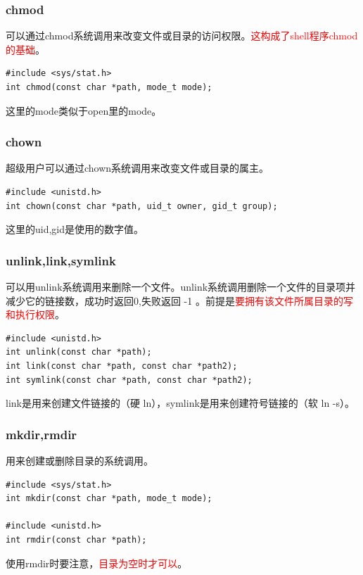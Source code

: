 \documentclass{beamer}
\begin{document}
\begin{frame}[fragile]
\frametitle{chmod}
可以通过chmod系统调用来改变文件或目录的访问权限。\textcolor{red}{这构成了shell程序chmod的基础}。
\begin{example}[chmod系统调用的原型]
\begin{verbatim}
#include <sys/stat.h>
int chmod(const char *path, mode_t mode);
\end{verbatim}
\end{example}
这里的mode类似于open里的mode。
\end{frame}


\begin{frame}[fragile]
\frametitle{chown}
超级用户可以通过chown系统调用来改变文件或目录的属主。
\begin{example}[chown系统调用的原型]
\begin{verbatim}
#include <unistd.h>
int chown(const char *path, uid_t owner, gid_t group);
\end{verbatim}
\end{example}
这里的uid,gid是使用的数字值。
\end{frame}


\begin{frame}[fragile]
\frametitle{unlink,link,symlink}
可以用unlink系统调用来删除一个文件。unlink系统调用删除一个文件的目录项并减少它的链接数，成功时返回0,失败返回
-1 。前提是\textcolor{red}{要拥有该文件所属目录的写和执行权限}。
\begin{example}
\begin{verbatim}
#include <unistd.h>
int unlink(const char *path);
int link(const char *path, const char *path2);
int symlink(const char *path, const char *path2);
\end{verbatim}
\end{example}
link是用来创建文件链接的（硬 ln），symlink是用来创建符号链接的（软 ln -s）。
\end{frame}


\begin{frame}[fragile]
\frametitle{mkdir,rmdir}
用来创建或删除目录的系统调用。
\begin{example}
\begin{verbatim}
#include <sys/stat.h>
int mkdir(const char *path, mode_t mode);

#include <unistd.h>
int rmdir(const char *path);
\end{verbatim}
\end{example}
使用rmdir时要注意，\textcolor{red}{目录为空时才可以}。
\end{frame}
\end{document}
